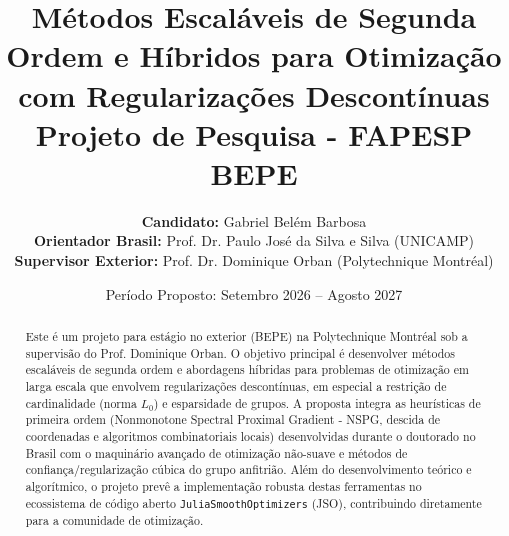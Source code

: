 \documentclass[11pt,a4paper]{article}
\title{\textbf{Métodos Escaláveis de Segunda Ordem e Híbridos para Otimização com Regularizações Descontínuas}\\
\large Projeto de Pesquisa - FAPESP BEPE}
\author{
    \textbf{Candidato:} Gabriel Belém Barbosa \\
    \textbf{Orientador Brasil:} Prof. Dr. Paulo José da Silva e Silva (UNICAMP) \\
    \textbf{Supervisor Exterior:} Prof. Dr. Dominique Orban (Polytechnique Montréal)
}
\date{Período Proposto: Setembro 2026 -- Agosto 2027}
\begin{document}
\maketitle

\begin{abstract}
Este é um projeto para estágio no exterior (BEPE) na Polytechnique Montréal sob a supervisão do Prof. Dominique Orban. O objetivo principal é desenvolver métodos escaláveis de segunda ordem e abordagens híbridas para problemas de otimização em larga escala que envolvem regularizações descontínuas, em especial a restrição de cardinalidade (norma $L_0$) e esparsidade de grupos. A proposta integra as heurísticas de primeira ordem (Nonmonotone Spectral Proximal Gradient - NSPG, descida de coordenadas e algoritmos combinatoriais locais) desenvolvidas durante o doutorado no Brasil com o maquinário avançado de otimização não-suave e métodos de confiança/regularização cúbica do grupo anfitrião. Além do desenvolvimento teórico e algorítmico, o projeto prevê a implementação robusta destas ferramentas no ecossistema de código aberto \texttt{JuliaSmoothOptimizers} (JSO), contribuindo diretamente para a comunidade de otimização.
\end{abstract}

\tableofcontents
\newpage








\end{document}
